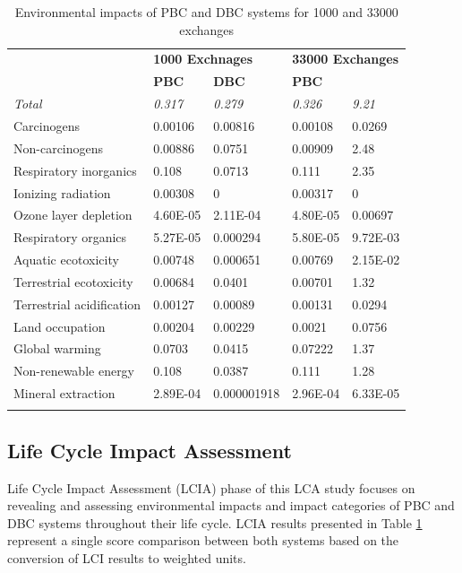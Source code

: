 \documentclass[3p,times,procedia]{elsarticle}
\begin{document}
\begin{table}[h]
\caption{Environmental impacts of PBC and DBC systems for 1000 and 33000 exchanges}
\begin{tabular*}{\hsize}{@{\extracolsep{\fill}}llllll@{}}
\toprule
\multicolumn{2}{l}{\multirow{2}{*}{\textbf{}}} & \multicolumn{2}{l}{\textbf{1000 Exchnages}} & \multicolumn{2}{l}{\textbf{33000 Exchanges}} \\ 
\colrule
\multicolumn{2}{l}{} & \textbf{DBC} & \textbf{PBC} & \textbf{DBC} & \textbf{PBC} \\
\multicolumn{2}{l}{\it{Total}} & \it{0.317} & \it{0.279} & \it{0.326} & \it{9.21} \\ 
\multicolumn{2}{l}{Carcinogens} & 0.00106 & 0.00816 & 0.00108 & 0.0269 \\ 
\multicolumn{2}{l}{Non-carcinogens} & 0.00886 & 0.0751 & 0.00909 & 2.48 \\ 
\multicolumn{2}{l}{Respiratory inorganics} & 0.108 & 0.0713 & 0.111 & 2.35 \\
\multicolumn{2}{l}{Ionizing radiation} & 0.00308 & 0 & 0.00317 & 0 \\
\multicolumn{2}{l}{Ozone layer depletion} & 4.60E-05 & 2.11E-04 & 4.80E-05 & 0.00697 \\ 
\multicolumn{2}{l}{Respiratory organics} & 5.27E-05 & 0.000294 & 5.80E-05 & 9.72E-03 \\
\multicolumn{2}{l}{Aquatic ecotoxicity} & 0.00748 & 0.000651 & 0.00769 & 2.15E-02 \\
\multicolumn{2}{l}{Terrestrial ecotoxicity} & 0.00684 & 0.0401 & 0.00701 & 1.32 \\ 
\multicolumn{2}{l}{Terrestrial acidification} & 0.00127 & 0.00089 & 0.00131 & 0.0294 \\ 
\multicolumn{2}{l}{Land occupation} & 0.00204 & 0.00229 & 0.0021 & 0.0756 \\ 
\multicolumn{2}{l}{Global warming} & 0.0703 & 0.0415 & 0.07222 & 1.37 \\ 
\multicolumn{2}{l}{Non-renewable energy} & 0.108 & 0.0387 & 0.111 & 1.28 \\ 
\multicolumn{2}{l}{Mineral extraction} & 2.89E-04 & 0.000001918 & 2.96E-04 & 6.33E-05 \\ 

\botrule
\end{tabular*}
\label{PBCandDBCexchanges}
\end{table}

\subsection{Life Cycle Impact Assessment}
Life Cycle Impact Assessment (LCIA) phase of this LCA study focuses on revealing and assessing environmental impacts and impact categories of PBC and DBC systems throughout their life cycle. LCIA results presented in Table \ref{PBCandDBCexchanges} represent a single score comparison between both systems based on the conversion of LCI results to weighted units.\\
\end{document}
